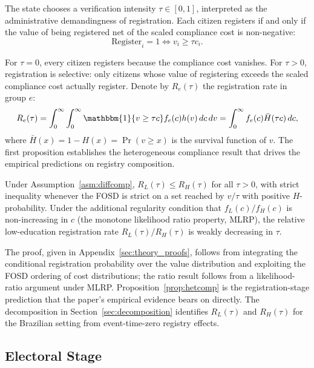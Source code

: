 The state chooses a verification intensity $\tau \in [0, 1]$, interpreted as the administrative demandingness of registration. Each citizen registers if and only if the value of being registered net of the scaled compliance cost is non-negative:
\begin{equation}
\text{Register}_i = 1 \iff v_i \geq \tau c_i.
\label{eq:registration_rule}
\end{equation}

For $\tau = 0$, every citizen registers because the compliance cost vanishes. For $\tau > 0$, registration is selective: only citizens whose value of registering exceeds the scaled compliance cost actually register. Denote by $R_e(\tau)$ the registration rate in group $e$:
\begin{equation}
R_e(\tau) = \int_0^\infty \int_0^\infty \mathbbm{1}\{v \geq \tau c\} f_e(c) h(v) \, dc \, dv = \int_0^\infty f_e(c) \bar H(\tau c) \, dc,
\label{eq:registration_rate}
\end{equation}
where $\bar H(x) = 1 - H(x) = \Pr(v \geq x)$ is the survival function of $v$. The first proposition establishes the heterogeneous compliance result that drives the empirical predictions on registry composition.

\begin{proposition}
\label{prop:hetcomp}
Under Assumption~\ref{asm:diffcomp}, $R_L(\tau) \leq R_H(\tau)$ for all $\tau > 0$, with strict inequality whenever the FOSD is strict on a set reached by $v/\tau$ with positive $H$-probability. Under the additional regularity condition that $f_L(c)/f_H(c)$ is non-increasing in $c$ (the monotone likelihood ratio property, MLRP), the relative low-education registration rate $R_L(\tau)/R_H(\tau)$ is weakly decreasing in $\tau$.
\end{proposition}

The proof, given in Appendix~\ref{sec:theory_proofs}, follows from integrating the conditional registration probability over the value distribution and exploiting the FOSD ordering of cost distributions; the ratio result follows from a likelihood-ratio argument under MLRP. Proposition~\ref{prop:hetcomp} is the registration-stage prediction that the paper's empirical evidence bears on directly. The decomposition in Section~\ref{sec:decomposition} identifies $R_L(\tau)$ and $R_H(\tau)$ for the Brazilian setting from event-time-zero registry effects.

\subsection{Electoral Stage}
\label{ssec:electoral}

